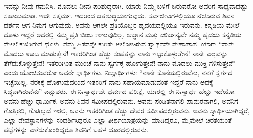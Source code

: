 ಇದನ್ನು ನೀವು ಗಮನಿಸಿ. ಮೊದಲು ನೀವು ಪರಿಶುದ್ಧರಾಗಿ. ಯಾರು ನಿಮ್ಮ ಬಳಿಗೆ ಬರುವರೋ ಅವರಿಗೆ ಸಾಧ್ಯವಾದಷ್ಟು ಸಹಾಯಮಾಡಿ. ಇದೇ ಸತ್ಕರ್ಮ. ಇದರಿಂದ ಚಿತ್ತಶುದ್ಧಿಯಾಗುವುದು. ಸರ್ವಜೀವಿಗಳಲ್ಲಿಯೂ ನೆಲೆಸಿರುವ ಶಿವನ ದರ್ಶನ ಆಗ ನಿಮಗೆ ಆಗುವುದು. ಅವನು ಆಗಲೇ ಪ್ರತಿಯೊಬ್ಬರ ಹೃದಯದಲ್ಲಿಯೂ ಇರುವನು. ಕನ್ನಡಿಯ ಮೇಲೆ ಧೂಳು ಇದ್ದರೆ ಅದರಲ್ಲಿ ನಮ್ಮ ಪ್ರತಿ ಬಿಂಬ ಕಾಣುವುದಿಲ್ಲ. ಅಜ್ಞಾನ ಮತ್ತು ದೌರ್ಜನ್ಯವೇ ನಮ್ಮ ಹೃದಯ ಕನ್ನಡಿಯ ಮೇಲೆ ಕುಳಿತಿರುವ ಧೂಳು. ನಮ್ಮ ಹಿತವನ್ನೇ ಕುರಿತು ಆಲೋಚಿಸುವ ಸ್ವಾರ್ಥವೇ ಮಹಾಪಾಪ. ಯಾರು “ನಾನು ಮೊದಲು ಊಟ ಮಾಡುತ್ತೇನೆ! ಇತರರಿಗಿಂತ ಹೆಚ್ಚು ಸಂಪತ್ತನ್ನು ನಾನು ಇಟ್ಟುಕೊಳ್ಳುತ್ತೇನೆ! ನಾನೇ ಎಲ್ಲವನ್ನು ತೆಗೆದುಕೊಳ್ಳುತ್ತೇನೆ! ಇತರರಿಗಿಂತ ಮುಂಚೆ ನಾನು ಸ್ವರ್ಗಕ್ಕೆ ಹೋಗುತ್ತೇನೆ! ನಾನು ಮೊದಲು ಮುಕ್ತಿ ಗಳಿಸುತ್ತೇನೆ” ಎಂದು ಯೋಚಿಸುವರೋ ಅವರೇ ಸ್ವಾರ್ಥಿಗಳು. ನಿಃಸ್ವಾರ್ಥಿಗಳು: “ನಾನೇ ಕೊನೆಯಲ್ಲಿರುವೆನು, ನನಗೆ ಸ್ವರ್ಗದ ಇಚ್ಛೆಯಿಲ್ಲ. ನರಕಕ್ಕೆ ಹೋಗುವುದರಿಂದ ಇತರರಿಗೆ ನಾನು ಸಹಾಯಮಾಡುವಂತೆ ಇದ್ದರೆ ನಾನು ಅದಕ್ಕೆ ಸಿದ್ಧನಾಗಿರುವೆನು” ಎನ್ನುವರು. ಈ ನಿಃಸ್ವಾರ್ಥವೇ ಧರ್ಮದ ಪರೀಕ್ಷೆ. ಯಾರಲ್ಲಿ ಈ ನಿಃಸ್ವಾರ್ಥ ಹೆಚ್ಚು ಇದೆಯೋ ಅವನು ಹೆಚ್ಚು ಧಾರ್ಮಿಕ, ಅವನು ಶಿವನ ಸಮೀಪದಲ್ಲಿರುವನು. ಅವನು ಪಂಡಿತನಾಗಲಿ ಪಾಮರನಾಗಲಿ, ಅವನಿಗೆ ಗೊತ್ತಿರಲಿ, ಗೊತ್ತಿಲ್ಲದೆ ಇರಲಿ, ಅವನು ಇತರರಿಗಿಂತ ಹೆಚ್ಚು ದೇವರ ಸಮೀಪದಲ್ಲಿರುವನು. ಅವನು ಸ್ವಾರ್ಥಿಯಾಗಿದ್ದರೆ, ಎಲ್ಲಾ ದೇವಸ್ಥಾನಗಳನ್ನು ಸಂದರ್ಶಿಸಿದ್ದರೂ ಎಲ್ಲಾ ತೀರ್ಥಯಾತ್ರೆಯನ್ನು ಮಾಡಿದ್ದರೂ, ಮೈಮೇಲೆ ಚಿರತೆಯಂತೆ ಪಟ್ಟೆಗಳನ್ನು ಎಳೆದುಕೊಂಡಿದ್ದರೂ ಶಿವನಿಗೆ ಬಹಳ ದೂರದಲ್ಲಿರುವನು.

